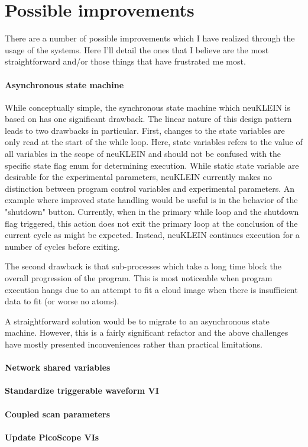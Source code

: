 \section{Possible improvements}
There are a number of possible improvements which I have realized through the usage of the systems.
Here I'll detail the ones that I believe are the most straightforward and/or those things that have frustrated me most.

\paragraph{Asynchronous state machine}
While conceptually simple, the synchronous state machine which neuKLEIN is based on has one significant drawback.
The linear nature of this design pattern leads to two drawbacks in particular.
First, changes to the state variables are only read at the start of the while loop.
Here, state variables refers to the value of all variables in the scope of neuKLEIN and should not be confused with the specific state flag enum for determining execution.
While static state variable are desirable for the experimental parameters, neuKLEIN currently makes no distinction between program control variables and experimental parameters.
An example where improved state handling would be useful is in the behavior of the "shutdown" button.
Currently, when in the primary while loop and the shutdown flag triggered, this action does not exit the primary loop at the conclusion of the current cycle as might be expected.
Instead, neuKLEIN continues execution for a number of cycles before exiting.

The second drawback is that sub-processes which take a long time block the overall progression of the program.
This is most noticeable when program execution hangs due to an attempt to fit a cloud image when there is insufficient data to fit (or worse no atoms).

A straightforward solution would be to migrate to an asynchronous state machine.
However, this is a fairly significant refactor and the above challenges have mostly presented inconveniences rather than practical limitations.

\paragraph{Network shared variables}

\paragraph{Standardize triggerable waveform VI}

\paragraph{Coupled scan parameters}

\paragraph{Update PicoScope VIs}
